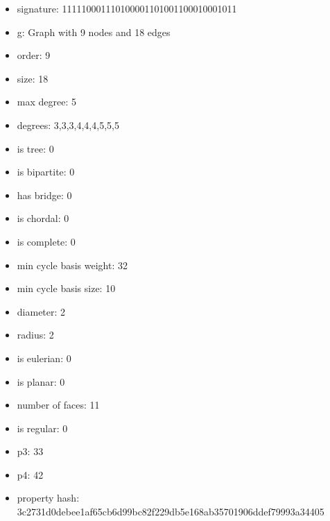 \newpage
\begin{figure}
\end{figure}
\begin{itemize}
\item signature: 111110001110100001101001100010001011
\item g: Graph with 9 nodes and 18 edges
\item order: 9
\item size: 18
\item max degree: 5
\item degrees: 3,3,3,4,4,4,5,5,5
\item is tree: 0
\item is bipartite: 0
\item has bridge: 0
\item is chordal: 0
\item is complete: 0
\item min cycle basis weight: 32
\item min cycle basis size: 10
\item diameter: 2
\item radius: 2
\item is eulerian: 0
\item is planar: 0
\item number of faces: 11
\item is regular: 0
\item p3: 33
\item p4: 42
\item property hash: 3c2731d0debee1af65cb6d99bc82f229db5e168ab35701906ddef79993a34405
\end{itemize}
